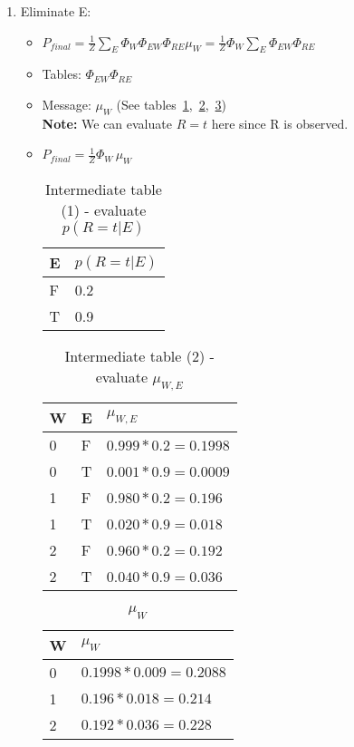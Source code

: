 \documentclass{article}
\begin{document}
\begin{enumerate}[label=(\alph*)]
\begin{enumerate}[label=\roman*.]
\begin{enumerate}[label=\alph*.]
\item Eliminate E:

\begin{itemize}

\item $P_{final}=\frac{1}{Z}\sum_{E}\Phi_{W}\Phi_{EW}\Phi_{RE}\mu_W = \frac{1}{Z}\Phi_{W}\sum_{E}\Phi_{EW}\Phi_{RE}$

\item Tables: $\Phi_{EW}\Phi_{RE}$

\item Message: $\mu_{W}$ (See tables~\ref{table:tbl3},~\ref{table:tbl4},~\ref{table:tbl5}) \\
\textbf{Note:} We can evaluate $R=t$ here since R is observed.

\item  $P_{final}=\frac{1}{Z}\Phi_{W}\,\mu_{W}$

\begin{table}[h]
\centering
\caption{Intermediate table (1) - evaluate $p(R=t|E)$}
\label{table:tbl3}
\begin{tabular}{|l|l|}
\hline
 E & $p(R=t|E)$   \\
\hline \hline
 F & 0.2  \\
 T & 0.9  \\
\hline
\end{tabular}
\end{table}

\begin{table}[h]
\centering
\caption{Intermediate table (2) - evaluate $\mu_{W,E}$}
\label{table:tbl4}
\begin{tabular}{|l|l|l|}
\hline
 W &E & $\mu_{W,E}$   \\
\hline \hline
0 & F & $0.999*0.2=0.1998$ \\
0 & T & $0.001*0.9=0.0009$ \\
1 & F & $0.980*0.2=0.196$ \\
1 & T & $0.020*0.9=0.018$ \\
2 & F & $0.960*0.2=0.192$ \\
2 & T & $0.040*0.9=0.036$ \\
\hline
\end{tabular}
\end{table}

\begin{table}[h]
\centering
\caption{$\mu_{W}$}
\label{table:tbl5}
\begin{tabular}{|l|l|}
\hline
 W  & $\mu_{W}$   \\
\hline \hline
0 & $0.1998*0.009=0.2088$ \\
1 & $0.196*0.018=0.214$ \\
2 & $0.192*0.036=0.228$ \\
\hline
\end{tabular}
\end{table}


\end{itemize}
\end{enumerate}
\end{enumerate}
\end{enumerate}
\end{document}
